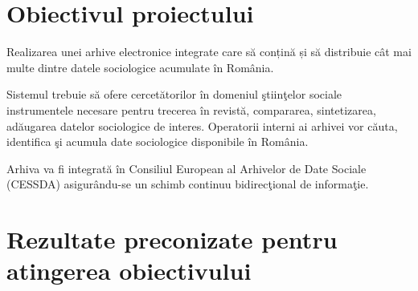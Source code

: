 \documentclass[a4paper, 10pt]{article}
\begin{document}
\medskip

\section{Obiectivul proiectului}

{
\foreignlanguage{english}{Realizarea }\foreignlanguage{romanian}{unei arhive electronice integrate care s\u{a}
con\c{t}in\u{a} \c{s}i s\u{a} distribuie c\^at mai multe dintre datele sociologice acumulate \^in Rom\^ania.}}

\medskip

Sistemul trebuie s\u{a} ofere cercet\u{a}torilor \^in domeniul \c{s}tiin\c{t}elor sociale instrumentele necesare pentru
trecerea \^in revist\u{a}, compararea, sintetizarea, ad\u{a}ugarea datelor sociologice de interes. Operatorii interni
ai arhivei vor c\u{a}uta, identifica \c{s}i acumula date sociologice disponibile \^in Rom\^ania.

\medskip

Arhiva va fi integrat\u{a} \^in Consiliul European al Arhivelor de Date Sociale (CESSDA) asigur\^andu-se un schimb
continuu bidirec\c{t}ional de informa\c{t}ie.

\section{Rezultate preconizate pentru atingerea obiectivului}
\end{document}
